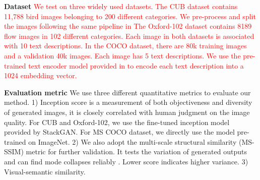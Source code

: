 \documentclass[10pt,twocolumn,letterpaper]{article}
\begin{document}
\textbf{Dataset} 
\textcolor{red}{We test on three widely used datasets. The CUB dataset \cite{welinder2010caltech} contains 11,788 bird images belonging to 200 different categories. We pre-process and split the images following the same pipeline in \cite{reed2016generative,han2017stackgan}
The Oxford-102 dataset \cite{Nilsback08} contains 8189 flow images in 102 different categories. 
Each image in both datasets is associated with 10 text descriptions. \textcolor{red}{In the COCO dataset, \cite{lin2014microsoft} there are 80k training images and a validation 40k images.  Each image has 5 text descriptions. }
We use the pre-trained text encoder model provided in \cite{reed2016generative} to encode each text description into a 1024 embedding vector.
}

\textbf{Evaluation metric}
We use three different quantitative metrics to evaluate our method.
1) Inception score \cite{improvedGAN} is a measurement of both objectiveness and diversity of generated images, it is closely correlated with human judgment on the image quality. For CUB and Oxford-102, we use the fine-tuned inception model provided by StackGAN. For MS COCO dataset, we directly use the model pre-trained on ImageNet.
2) We also adopt the multi-scale structural similarity (MS-SSIM) metric \cite{improvedGAN} for further validation. It tests the variation of generated outputs and can find mode collapses reliably \cite{odena2016conditional}. Lower score indicates higher variance. 3) Visual-semantic similarity.
\end{document}
